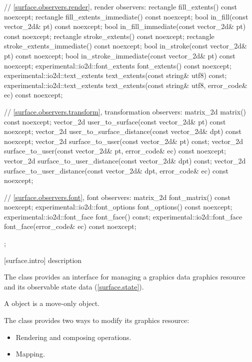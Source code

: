 \begin{codeblock}
{{{{{    // \ref{surface.observers.render}, render observers:
    rectangle fill_extents() const noexcept;
    rectangle fill_extents_immediate() const noexcept;
    bool in_fill(const vector_2d& pt) const noexcept;
    bool in_fill_immediate(const vector_2d& pt) const noexcept;
    rectangle stroke_extents() const noexcept;
    rectangle stroke_extents_immediate() const noexcept;
    bool in_stroke(const vector_2d& pt) const noexcept;
    bool in_stroke_immediate(const vector_2d& pt) const noexcept;
    experimental::io2d::font_extents font_extents() const noexcept;
    experimental::io2d::text_extents text_extents(const string& utf8) const;
    experimental::io2d::text_extents text_extents(const string& utf8,
      error_code& ec) const noexcept;
    
    // \ref{surface.observers.transform}, transformation observers:
    matrix_2d matrix() const noexcept;
    vector_2d user_to_surface(const vector_2d& pt) const noexcept;
    vector_2d user_to_surface_distance(const vector_2d& dpt) const noexcept;
    vector_2d surface_to_user(const vector_2d& pt) const;
    vector_2d surface_to_user(const vector_2d& pt, error_code& ec) const
      noexcept;
    vector_2d surface_to_user_distance(const vector_2d& dpt) const;
    vector_2d surface_to_user_distance(const vector_2d& dpt, error_code& ec)
      const noexcept;
    
    // \ref{surface.observers.font}, font observers:
    matrix_2d font_matrix() const noexcept;
    experimental::io2d::font_options font_options() const noexcept;
    experimental::io2d::font_face font_face() const;
    experimental::io2d::font_face font_face(error_code& ec) const noexcept;
  };
} } } }
\end{codeblock}

 [surface.intro] { description}

\pnum
{}
The  class provides an interface for managing a graphics
data graphics resource and its observable state data
(\ref{surface.state}).

\pnum
A  object is a move-only object.

\pnum
The  class provides two ways to modify its graphics resource:
\begin{itemize}
\item Rendering and composing operations.
\item Mapping.
\end{itemize}


